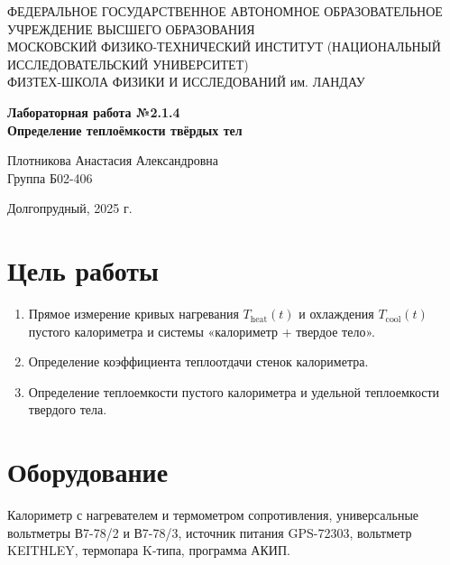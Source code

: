\documentclass[a4paper,12pt]{article} %
\begin{document}
\begin{center}
	\footnotesize{ФЕДЕРАЛЬНОЕ ГОСУДАРСТВЕННОЕ АВТОНОМНОЕ ОБРАЗОВАТЕЛЬНОЕ УЧРЕЖДЕНИЕ ВЫСШЕГО ОБРАЗОВАНИЯ}\\
	\footnotesize{МОСКОВСКИЙ ФИЗИКО-ТЕХНИЧЕСКИЙ ИНСТИТУТ (НАЦИОНАЛЬНЫЙ ИССЛЕДОВАТЕЛЬСКИЙ УНИВЕРСИТЕТ)}\\
	\footnotesize{ФИЗТЕХ-ШКОЛА ФИЗИКИ И ИССЛЕДОВАНИЙ им. ЛАНДАУ}
\end{center}

\vspace{2cm}

\begin{center}
	\Large{\textbf{Лабораторная работа №2.1.4\\[0.5em]Определение теплоёмкости твёрдых тел}}
	
	\vspace{1cm}
	\begin{flushright}
		Плотникова Анастасия Александровна\\
		Группа Б02-406
	\end{flushright}
\end{center}

\vfill

\begin{center}
	Долгопрудный, 2025 г.
\end{center}

\newpage

\section*{Цель работы}
\begin{enumerate}
	\item Прямое измерение кривых нагревания $T_{\text{heat}}(t)$ и охлаждения $T_{\text{cool}}(t)$ пустого калориметра и системы «калориметр + твердое тело».
	\item Определение коэффициента теплоотдачи стенок калориметра.
	\item Определение теплоемкости пустого калориметра и удельной теплоемкости твердого тела.
\end{enumerate}

\section*{Оборудование}
Калориметр с нагревателем и термометром сопротивления, универсальные вольтметры В7-78/2 и В7-78/3, источник питания GPS-72303, вольтметр KEITHLEY, термопара K-типа, программа АКИП.
\end{document}
